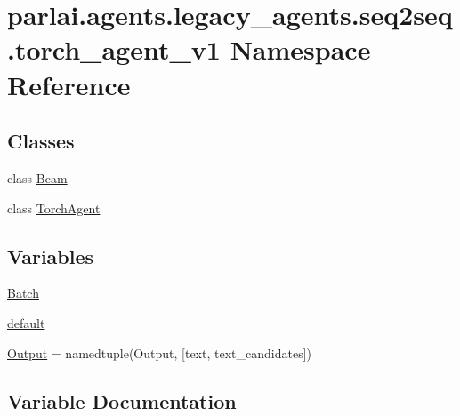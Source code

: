 \hypertarget{namespaceparlai_1_1agents_1_1legacy__agents_1_1seq2seq_1_1torch__agent__v1}{}\section{parlai.\+agents.\+legacy\+\_\+agents.\+seq2seq.\+torch\+\_\+agent\+\_\+v1 Namespace Reference}
\label{namespaceparlai_1_1agents_1_1legacy__agents_1_1seq2seq_1_1torch__agent__v1}
\subsection*{Classes}
\begin{DoxyCompactItemize}
\item 
class \hyperlink{classparlai_1_1agents_1_1legacy__agents_1_1seq2seq_1_1torch__agent__v1_1_1Beam}{Beam}
\item 
class \hyperlink{classparlai_1_1agents_1_1legacy__agents_1_1seq2seq_1_1torch__agent__v1_1_1TorchAgent}{Torch\+Agent}
\end{DoxyCompactItemize}
\subsection*{Variables}
\begin{DoxyCompactItemize}
\item 
\hyperlink{namespaceparlai_1_1agents_1_1legacy__agents_1_1seq2seq_1_1torch__agent__v1_a74cfde390a2b9861179ac0fcd59da28c}{Batch}
\item 
\hyperlink{namespaceparlai_1_1agents_1_1legacy__agents_1_1seq2seq_1_1torch__agent__v1_a5d17ee55b86a7e7ee0de4dca59bf3bdc}{default}
\item 
\hyperlink{namespaceparlai_1_1agents_1_1legacy__agents_1_1seq2seq_1_1torch__agent__v1_a2689006ea97d09413fb242f984bd8016}{Output} = namedtuple(\textquotesingle{}Output\textquotesingle{}, \mbox{[}\textquotesingle{}text\textquotesingle{}, \textquotesingle{}text\+\_\+candidates\textquotesingle{}\mbox{]})
\end{DoxyCompactItemize}


\subsection{Variable Documentation}
\mbox{\label{namespaceparlai_1_1agents_1_1legacy__agents_1_1seq2seq_1_1torch__agent__v1_a74cfde390a2b9861179ac0fcd59da28c}} 
